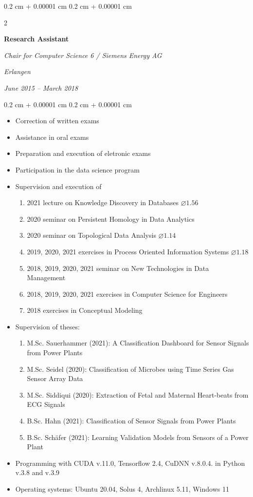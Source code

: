 \documentclass[10pt, letterpaper]{article}
\newenvironment{highlights}{
    \begin{itemize}[
        topsep=0.10 cm,
        parsep=0.10 cm,
        partopsep=0pt,
        itemsep=0pt,
        leftmargin=0.4 cm + 10pt
    ]
}{
    \end{itemize}
}
\newenvironment{onecolentry}{
    \begin{adjustwidth}{
        0.2 cm + 0.00001 cm
    }{
        0.2 cm + 0.00001 cm
    }
}{
    \end{adjustwidth}
}
\newenvironment{twocolentry}[2][]{
    \onecolentry
    \def\secondColumn{#2}
    \setcolumnwidth{\fill, 4.5 cm}
    \begin{paracol}{2}
}{
    \switchcolumn \raggedleft \secondColumn
    \end{paracol}
    \endonecolentry
}
\begin{document}
\begin{twocolentry}{
    \textit{Erlangen}    
    
    \textit{June 2015 – March 2018}}
    \textbf{Research Assistant}
    
    \textit{Chair for Computer Science 6 / Siemens Energy AG}
\end{twocolentry}

\vspace{0.10 cm}
\begin{onecolentry}
	\begin{highlights}
		\item Correction of written exams
        \item Assistance in oral exams
        \item Preparation and execution of eletronic exams
        \item Participation in the data science program
        \item Supervision and execution of
        \begin{enumerate}
            \item 2021 lecture on Knowledge Discovery in Databases $\varnothing 1.56$
            \item 2020 seminar on Persistent Homology in Data Analytics
            \item 2020 seminar on Topological Data Analysis $\varnothing 1.14$
            \item 2019, 2020, 2021 exercises in Process Oriented Information Systems $\varnothing 1.18$
            \item 2018, 2019, 2020, 2021 seminar on New Technologies in Data Management
            \item 2018, 2019, 2020, 2021 exercises in Computer Science for Engineers
            \item 2018 exercises in Conceptual Modeling
        \end{enumerate}
        \item Supervision of theses:
        \begin{enumerate}
            \item M.Sc. Sauerhammer (2021): A Classification Dashboard for Sensor Signals from Power Plants
            \item M.Sc. Seidel (2020): Classification of Microbes using Time Series Gas Sensor Array Data
            \item M.Sc. Siddiqui (2020): Extraction of Fetal and Maternal Heart-beats from ECG Signals
            \item B.Sc. Hahn (2021): Classification of Sensor Signals from Power Plants
            \item B.Sc. Schäfer (2021): Learning Validation Models from Sensors of a
Power Plant
        \end{enumerate}
        \item Programming with CUDA v.11.0, Tensorflow 2.4, CuDNN v.8.0.4. in Python v.3.8 and v.3.9
        \item Operating systems: Ubuntu 20.04, Solus 4, Archlinux 5.11, Windows 11
	\end{highlights}
\end{onecolentry}
\vspace{0.2 cm}
\end{document}
